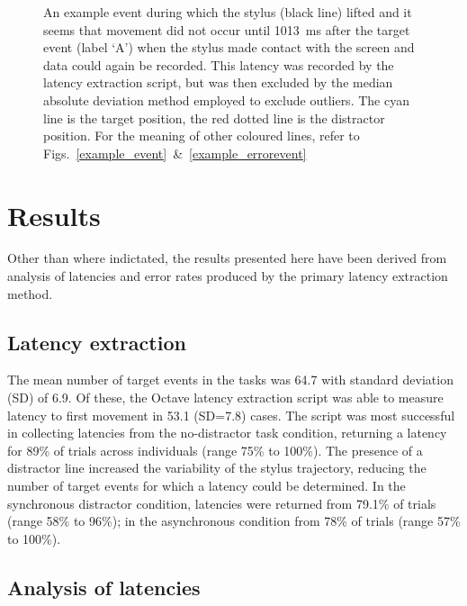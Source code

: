 \documentclass[10pt,letterpaper]{article}
\begin{document}
\begin{figure}[htb!]
\centering
\caption[Stylus lifted] {An example event during which the stylus
  (black line) lifted and it seems that movement did not occur until
  1013~ms after the target event (label `A') when the stylus made
  contact with the screen and data could again be recorded. This
  latency was recorded by the latency extraction script, but was then
  excluded by the median absolute deviation method employed to exclude
  outliers. The cyan line is the target position, the red dotted line
  is the distractor position. For the meaning of other coloured lines,
  refer to Figs.~\ref{example_event}~\&~\ref{example_errorevent}}
\label{stylus_lifted}
\end{figure}


\section*{Results}

Other than where indictated, the results presented here have been
derived from analysis of latencies and error rates produced by the
primary latency extraction method.

\subsection*{Latency extraction}

The mean number of target events in the tasks was 64.7 with standard
deviation (SD) of 6.9. Of these, the Octave latency extraction script
was able to measure latency to first movement in 53.1 (SD=7.8)
cases. The script was most successful in collecting latencies from the
no-distractor task condition, returning a latency for 89\% of trials
across individuals (range 75\% to 100\%). The presence of a distractor
line increased the variability of the stylus trajectory, reducing the
number of target events for which a latency could be determined. In
the synchronous distractor condition, latencies were returned from
79.1\% of trials (range 58\% to 96\%); in the asynchronous condition
from 78\% of trials (range 57\% to 100\%).

\subsection*{Analysis of latencies}
\end{document}
